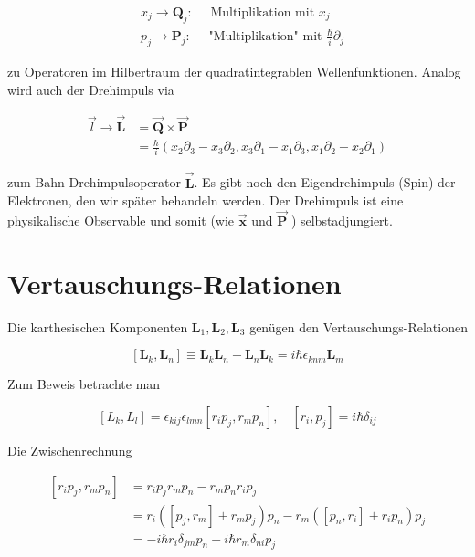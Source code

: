\documentclass[10pt, letterpaper]{article}
\begin{document}
$$
\begin{aligned}
& x_{j} \rightarrow \mathbf{Q}_{j}: \quad \text { Multiplikation mit } x_{j} \\
& p_{j} \rightarrow \mathbf{P}_{j}: \quad \text { "Multiplikation" mit } \frac{\hbar}{i} \partial_{j}
\end{aligned}
$$

zu Operatoren im Hilbertraum der quadratintegrablen Wellenfunktionen. Analog wird auch der Drehimpuls via

$$
\begin{aligned}
\vec{l} \rightarrow \overrightarrow{\mathbf{L}} & =\overrightarrow{\mathbf{Q}} \times \overrightarrow{\mathbf{P}} \\
& =\frac{\hbar}{i}\left(x_{2} \partial_{3}-x_{3} \partial_{2}, x_{3} \partial_{1}-x_{1} \partial_{3}, x_{1} \partial_{2}-x_{2} \partial_{1}\right)
\end{aligned}
$$

zum Bahn-Drehimpulsoperator $\overrightarrow{\mathbf{L}}$. Es gibt noch den Eigendrehimpuls (Spin) der Elektronen, den wir später behandeln werden. Der Drehimpuls ist eine physikalische Observable und somit (wie $\overrightarrow{\mathbf{x}}$ und $\overrightarrow{\mathbf{P}}$ ) selbstadjungiert.

\section*{Vertauschungs-Relationen}
Die karthesischen Komponenten $\mathbf{L}_{1}, \mathbf{L}_{2}, \mathbf{L}_{3}$ genügen den Vertauschungs-Relationen

$$
\left[\mathbf{L}_{k}, \mathbf{L}_{n}\right] \equiv \mathbf{L}_{k} \mathbf{L}_{n}-\mathbf{L}_{n} \mathbf{L}_{k}=i \hbar \epsilon_{k n m} \mathbf{L}_{m}
$$

Zum Beweis betrachte man

$$
\left[L_{k}, L_{l}\right]=\epsilon_{k i j} \epsilon_{l m n}\left[r_{i} p_{j}, r_{m} p_{n}\right], \quad\left[r_{i}, p_{j}\right]=i \hbar \delta_{i j}
$$

Die Zwischenrechnung

$$
\begin{aligned}
{\left[r_{i} p_{j}, r_{m} p_{n}\right] } & =r_{i} p_{j} r_{m} p_{n}-r_{m} p_{n} r_{i} p_{j} \\
& =r_{i}\left(\left[p_{j}, r_{m}\right]+r_{m} p_{j}\right) p_{n}-r_{m}\left(\left[p_{n}, r_{i}\right]+r_{i} p_{n}\right) p_{j} \\
& =-i \hbar r_{i} \delta_{j m} p_{n}+i \hbar r_{m} \delta_{n i} p_{j}
\end{aligned}
$$
\end{document}
